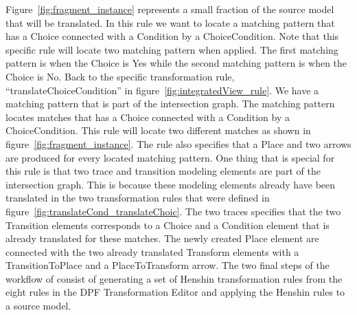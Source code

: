 Figure~\ref{fig:fragment_instance} represents a small fraction of the source
model that will be translated. In this rule we want to locate a matching pattern
that has a Choice connected with a Condition by a ChoiceCondition. Note that
this specific rule will locate two matching pattern when applied. The first
matching pattern is when the Choice is Yes while the second matching pattern is
when the Choice is No. Back to the specific transformation rule,
``translateChoiceCondition'' in figure~\ref{fig:integratedView_rule}. We have a
matching pattern that is part of the intersection graph. The matching pattern
locates matches that has a Choice connected with a Condition by a
ChoiceCondition. This rule will locate two different matches as shown in 
figure~\ref{fig:fragment_instance}. The rule also specifies that a Place
and two arrows are produced for every located matching pattern. One thing that
is special for this rule is that two trace and transition modeling elements are
part of the intersection graph. This is because these modeling elements already
have been translated in the two transformation rules that were defined in
figure~\ref{fig:translateCond_translateChoic}. The two traces specifies that the
two Transition elements corresponds to a Choice and a Condition element that is
already translated for these matches. The newly created Place element are
connected with the two already translated Transform elements with a
TransitionToPlace and a PlaceToTransform arrow. The two final steps of the
workflow of consist of generating a set of Henshin transformation rules from the
eight rules in the DPF Transformation Editor and applying the Henshin rules to a
source model. 

